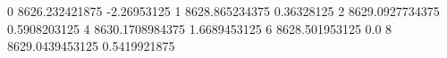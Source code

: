 0 8626.232421875 -2.26953125
1 8628.865234375 0.36328125
2 8629.0927734375 0.5908203125
4 8630.1708984375 1.6689453125
6 8628.501953125 0.0
8 8629.0439453125 0.5419921875
